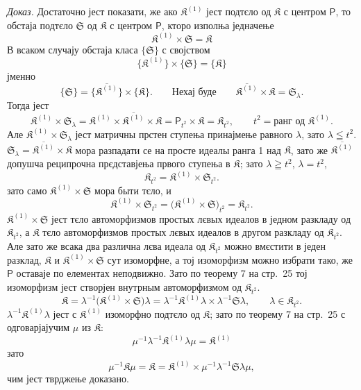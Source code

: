 \documentclass[11pt]{article}
\begin{document}
\emph{Доказ.} Достаточно јест показати, же ако \(\mathfrak K^{(1)}\) јест подтєло од \(\mathfrak K\) с центром \(\mathsf P\), то обстаја подтєло \(\mathfrak S\) од \(\mathfrak K\) с центром \(\mathsf P\), кторо изполња једначење
\[
\mathfrak K^{(1)}\times\mathfrak S=\mathfrak K
\]
В всаком случају обстаја класа \(\{\mathfrak S\}\) с својством
\[
\{\mathfrak K^{(1)}\}\times\{\mathfrak S\}=\{\mathfrak K\}
\]
јменно
\[
\{\mathfrak S\}=\{\overline{\mathfrak K^{(1)}}\}\times\{\mathfrak K\}.
\qquad
\text{Нехај буде}\qquad
\overline{\mathfrak K^{(1)}}\times\mathfrak K=\mathfrak S_\lambda.
\]
Тогда јест
\[
\mathfrak K^{(1)}\times\mathfrak S_\lambda
=\mathfrak K^{(1)}\times\overline{\mathfrak K^{(1)}}\times\mathfrak K
=\mathsf P_{t^2}\times\mathfrak K
=\mathfrak K_{t^2},
\qquad
t^2=\text{ранг од }\mathfrak K^{(1)}.
\]
Але \(\mathfrak K^{(1)}\times\mathfrak S_\lambda\) јест матричны прстен ступења принајмење равного \(\lambda\), зато \(\lambda\leqq t^2\). \(\mathfrak S_\lambda=\overline{\mathfrak K^{(1)}}\times\mathfrak K\) мора разпадати се на просте идеалы ранга 1 над \(\mathfrak K\), зато же \(\overline{\mathfrak K^{(1)}}\) допушча реципрочна прєдставјења првого ступења в \(\mathfrak K\); зато \(\lambda\geqq t^2\), \(\lambda=t^2\),
\[
\mathfrak K_{t^2}=\mathfrak K^{(1)}\times\mathfrak S_{t^2}.
\]
зато само \(\mathfrak K^{(1)}\times\mathfrak S\) мора быти тєло, и
\[
\mathfrak K^{(1)}\times\mathfrak S_{t^2}
=\bigl(\mathfrak K^{(1)}\times\mathfrak S\bigr)_{t^2}
=\mathfrak K_{t^2}.
\]
\(\mathfrak K^{(1)}\times\mathfrak S\) јест тєло автоморфизмов простых лєвых идеалов в једном разкладу од \(\mathfrak K_{t^2}\), а \(\mathfrak K\) тєло автоморфизмов простых лєвых идеалов в другом разкладу од \(\mathfrak K_{t^2}\). Але зато же всака два различна лєва идеала од \(\mathfrak K_{t^2}\) можно вмєстити в једен разклад, \(\mathfrak K\) и \(\mathfrak K^{(1)}\times\mathfrak S\) сут изоморфне, а тој изоморфизм можно избрати тако, же \(\mathsf P\) оставаје по елементах неподвижно. Зато по теорему 7 на стр.~25 тој изоморфизм јест створјен внутрным автоморфизмом од \(\mathfrak K_{t^2}\).
\[
\mathfrak K
=\lambda^{-1}\bigl(\mathfrak K^{(1)}\times\mathfrak S\bigr)\lambda
=\lambda^{-1}\mathfrak K^{(1)}\lambda\times\lambda^{-1}\mathfrak S\lambda,
\qquad
\lambda\in\mathfrak K_{t^2}.
\]
\(\lambda^{-1}\mathfrak K^{(1)}\lambda\) јест с \(\mathfrak K^{(1)}\) изоморфно подтєло од \(\mathfrak K\); зато по теорему 7 на стр.~25 с одговарјајучим \(\mu\) из \(\mathfrak K\):
\[
\mu^{-1}\lambda^{-1}\mathfrak K^{(1)}\lambda\mu=\mathfrak K^{(1)}
\]
зато
\[
\mu^{-1}\mathfrak K\mu
=\mathfrak K
=\mathfrak K^{(1)}\times\mu^{-1}\lambda^{-1}\mathfrak S\lambda\mu,
\]
чим јест тврджење доказано.
\end{document}
